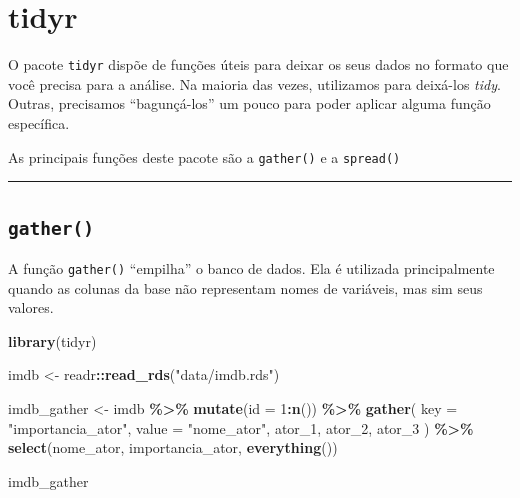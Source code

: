\documentclass[
]{book}
\newenvironment{Shaded}{\begin{snugshade}}{\end{snugshade}}
\newcommand{\DataTypeTok}[1]{\textcolor[rgb]{0.13,0.29,0.53}{#1}}
\newcommand{\DecValTok}[1]{\textcolor[rgb]{0.00,0.00,0.81}{#1}}
\newcommand{\KeywordTok}[1]{\textcolor[rgb]{0.13,0.29,0.53}{\textbf{#1}}}
\newcommand{\NormalTok}[1]{#1}
\newcommand{\OperatorTok}[1]{\textcolor[rgb]{0.81,0.36,0.00}{\textbf{#1}}}
\newcommand{\StringTok}[1]{\textcolor[rgb]{0.31,0.60,0.02}{#1}}
\begin{document}
\hypertarget{tidyr}{%
\section{tidyr}\label{tidyr}}

O pacote \texttt{tidyr} dispõe de funções úteis para deixar os seus dados no formato que você precisa para a análise. Na maioria das vezes, utilizamos para deixá-los \emph{tidy}. Outras, precisamos ``bagunçá-los'' um pouco para poder aplicar alguma função específica.

As principais funções deste pacote são a \texttt{gather()} e a \texttt{spread()}

\begin{center}\rule{0.5\linewidth}{0.5pt}\end{center}

\hypertarget{gather}{%
\subsection{\texorpdfstring{\texttt{gather()}}{gather()}}\label{gather}}

A função \texttt{gather()} ``empilha'' o banco de dados. Ela é utilizada principalmente quando as colunas da base não representam nomes de variáveis, mas sim seus valores.

\begin{Shaded}
\begin{Highlighting}[]
\KeywordTok{library}\NormalTok{(tidyr)}

\NormalTok{imdb <{-}}\StringTok{ }\NormalTok{readr}\OperatorTok{::}\KeywordTok{read\_rds}\NormalTok{(}\StringTok{"data/imdb.rds"}\NormalTok{)}

\NormalTok{imdb\_gather <{-}}\StringTok{ }\NormalTok{imdb }\OperatorTok{\%>\%}
\StringTok{  }\KeywordTok{mutate}\NormalTok{(}\DataTypeTok{id =} \DecValTok{1}\OperatorTok{:}\KeywordTok{n}\NormalTok{()) }\OperatorTok{\%>\%}
\StringTok{  }\KeywordTok{gather}\NormalTok{(}
    \DataTypeTok{key =} \StringTok{"importancia\_ator"}\NormalTok{,}
    \DataTypeTok{value =} \StringTok{"nome\_ator"}\NormalTok{,}
\NormalTok{    ator\_}\DecValTok{1}\NormalTok{, ator\_}\DecValTok{2}\NormalTok{, ator\_}\DecValTok{3}
\NormalTok{  ) }\OperatorTok{\%>\%}
\StringTok{  }\KeywordTok{select}\NormalTok{(nome\_ator, importancia\_ator, }\KeywordTok{everything}\NormalTok{())}

\NormalTok{imdb\_gather}
\end{Highlighting}
\end{Shaded}
\end{document}
